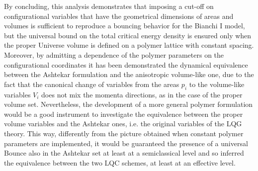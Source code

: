 \documentclass[aps,prd,twocolumn,nofootinbib,superscriptaddress]{revtex4-2}
\begin{document}
By concluding, this analysis demonstrates that imposing a cut-off on configurational variables that have the geometrical dimensions of areas and volumes is sufficient to reproduce a bouncing behavior for the Bianchi I model, but the universal bound on the total critical energy density is ensured only when the proper Universe volume is defined on a polymer lattice with constant spacing. Moreover, by admitting a dependence of the polymer parameters on the configurational coordinates it has been demonstrated the dynamical equivalence between the Ashtekar formulation and the anisotropic volume-like one, due to the fact that the canonical change of variables from the areas $p_i$ to the volume-like variables $V_i$ does not mix the momenta directions, as in the case of the proper volume set. Nevertheless, the development of a more general polymer formulation would be a good instrument to investigate the equivalence between the proper volume variables and the Ashtekar ones, i.e. the original variables of the LQG theory. This way, differently from the picture obtained when constant polymer parameters are implemented, it would be guaranteed the presence of a universal Bounce also in the Ashtekar set at least at a semiclassical level and so inferred the equivalence between the two LQC schemes, at least at an effective level.
\end{document}

